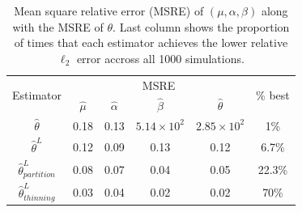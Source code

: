     \begin{table}[!ht]
        \begin{center}  
            \centering
            \begin{tabular}{c|cccc|c}
                \multirow{2}{*}{Estimator} & \multicolumn{4}{c|}{MSRE} & \multirow{2}{*}{$\%$ best}\\
                & $\hat \mu$ & $\hat \alpha$ & $\hat \beta$ & $\hat \theta$ \\
                \midrule
                $\hat \theta$ & 0.18 & 0.13 & $5.14 \times 10^{2}$ & $2.85\times 10^{2}$ & 1\%\\
                $\hat \theta^L$ & 0.12 & 0.09 & 0.13 & 0.12 & 6.7\%\\
                $\hat \theta^L_{partition}$ & 0.08 & 0.07 & 0.04 & 0.05 & 22.3\%\\
                $\hat \theta^L_{thinning}$ & 0.03 & 0.04 & 0.02 & 0.02 & 70\% \\
            \end{tabular}
            \caption{Mean square relative error (MSRE) of  $(\mu, \alpha, \beta)$ along with the MSRE of $\theta$.
            Last column shows the proportion of times that each estimator achieves the lower relative $\ell_2$ error accross all 1000 simulations.}
            \label{tab:chap5_subsampling_table}
        \end{center}
    \end{table}






